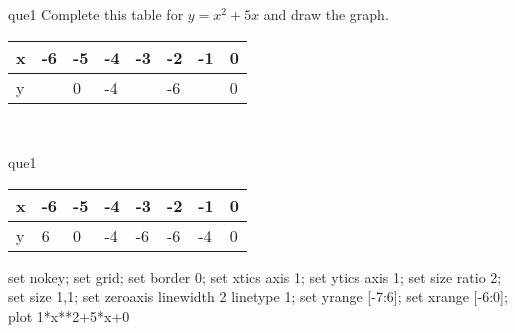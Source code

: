 \documentclass[13.5pt, varwidth=true]{beamer}
\begin{document}
\begin{frame}[shrink=19,fragile]
	\begin{beamercolorbox}[rounded=true, left, shadow=true,wd=14.8cm]{que1}
		 Complete this table for $y = x^{2} + 5x$ and draw the graph. \\[0.3cm] \renewcommand{\arraystretch}{1.2}\begin{tabular}{|C|C|C|C|C|C|C|C|} \hline x & -6 & -5 & -4 & -3 & -2 & -1 & 0 \\ \hline y &  & 0 & -4 &  & -6 &  & 0\\ \hline \end{tabular}\\[0.3cm]
	\end{beamercolorbox}
\end{frame}
\begin{frame}[shrink=19,fragile]
	\begin{beamercolorbox}[rounded=true, left, shadow=true,wd=14.8cm]{que1}
		\renewcommand{\arraystretch}{1.2}\begin{tabular}{|C|C|C|C|C|C|C|C|} \hline x & -6 & -5 & -4 & -3 & -2 & -1 & 0 \\ \hline y & 6 & 0 & -4 & -6 & -6 & -4 & 0\\ \hline \end{tabular}\begin{gnuplot}[terminal=pdf] set nokey; set grid; set border 0; set xtics axis 1; set ytics axis 1; set size ratio 2; set size 1,1; set zeroaxis linewidth 2 linetype 1; set yrange [-7:6]; set xrange [-6:0]; plot 1*x**2+5*x+0 \end{gnuplot}
	\end{beamercolorbox}
\end{frame}
\end{document}
